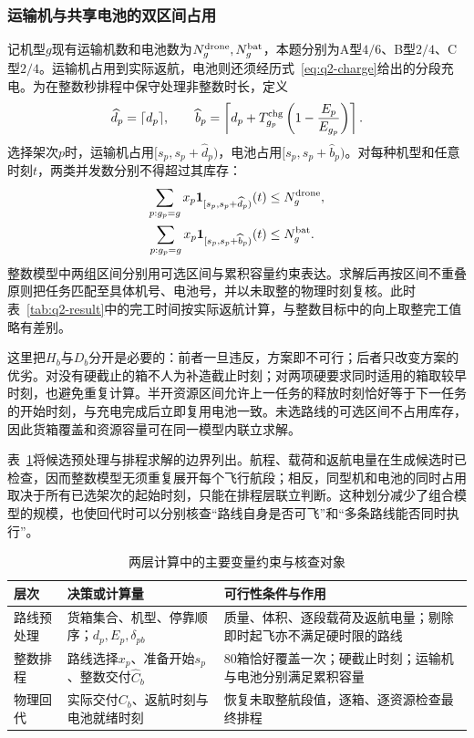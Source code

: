 \documentclass[bwprint,fontset=fandol]{gmcmthesis}
\begin{document}
\subsubsection{运输机与共享电池的双区间占用}
记机型$g$现有运输机数和电池数为$N_g^{\rm drone},N_g^{\rm bat}$，本题分别为A型$4/6$、B型$2/4$、C型$2/4$。运输机占用到实际返航，电池则还须经历式~\eqref{eq:q2-charge}给出的分段充电。为在整数秒排程中保守处理非整数时长，定义
\begin{equation}
\widehat d_p=\lceil d_p\rceil,\qquad
\widehat b_p=\left\lceil d_p+T_{g_p}^{\rm chg}
\left(1-\frac{E_p}{E_{g_p}}\right)\right\rceil.
\label{eq:q2-reserved-length}
\end{equation}
选择架次$p$时，运输机占用$[s_p,s_p+\widehat d_p)$，电池占用$[s_p,s_p+\widehat b_p)$。对每种机型和任意时刻$t$，两类并发数分别不得超过其库存：
\begin{align}
\sum_{p:g_p=g}x_p\mathbf 1_{[s_p,s_p+\widehat d_p)}(t)
&\le N_g^{\rm drone},\\
\sum_{p:g_p=g}x_p\mathbf 1_{[s_p,s_p+\widehat b_p)}(t)
&\le N_g^{\rm bat}.
\label{eq:q2-cumulative}
\end{align}
整数模型中两组区间分别用可选区间与累积容量约束表达。求解后再按区间不重叠原则把任务匹配至具体机号、电池号，并以未取整的物理时刻复核。此时表~\ref{tab:q2-result}中的完工时间按实际返航计算，与整数目标中的向上取整完工值略有差别。

这里把$H_b$与$D_b$分开是必要的：前者一旦违反，方案即不可行；后者只改变方案的优劣。对没有硬截止的箱不人为补造截止时刻；对两项硬要求同时适用的箱取较早时刻，也避免重复计算。半开资源区间允许上一任务的释放时刻恰好等于下一任务的开始时刻，与充电完成后立即复用电池一致。未选路线的可选区间不占用库存，因此货箱覆盖和资源容量可在同一模型内联立求解。

表~\ref{tab:q2-model-map}将候选预处理与排程求解的边界列出。航程、载荷和返航电量在生成候选时已检查，因而整数模型无须重复展开每个飞行航段；相反，同型机和电池的同时占用取决于所有已选架次的起始时刻，只能在排程层联立判断。这种划分减少了组合模型的规模，也使回代时可以分别核查“路线自身是否可飞”和“多条路线能否同时执行”。
\begin{table}[htbp]
\centering\small
\caption{两层计算中的主要变量约束与核查对象}
\label{tab:q2-model-map}
\begin{tabular}{@{}p{}p{}p{}@{}}
\toprule
层次 & 决策或计算量 & 可行性条件与作用\\
\midrule
路线预处理 & 货箱集合、机型、停靠顺序；$d_p,E_p,\delta_{pb}$ & 质量、体积、逐段载荷及返航电量；剔除即时起飞亦不满足硬时限的路线\\
整数排程 & 路线选择$x_p$、准备开始$s_p$、整数交付$\widehat C_b$ & 80箱恰好覆盖一次；硬截止时刻；运输机与电池分别满足累积容量\\
物理回代 & 实际交付$C_b$、返航时刻与电池就绪时刻 & 恢复未取整航段值，逐箱、逐资源检查最终排程\\
\bottomrule
\end{tabular}
\end{table}
\end{document}
